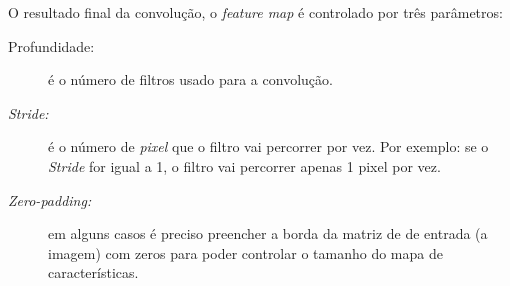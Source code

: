 \begin{figure}[H]
	\centering
\end{figure}

O resultado final da convolução, o \textit{feature map} é controlado por três parâmetros:
\begin{description}
    \item[Profundidade:] é o número de filtros usado para a convolução.
    \item[\textit{Stride:}] é o número de \textit{pixel} que o filtro vai percorrer por vez. Por exemplo: se o \textit{Stride} for igual a 1, o filtro vai percorrer apenas 1 pixel por vez.
    \item[\textit{Zero-padding:}] em alguns casos é preciso preencher a borda da matriz de de entrada (a imagem) com zeros para poder controlar o tamanho do mapa de características. 
\end{description}

